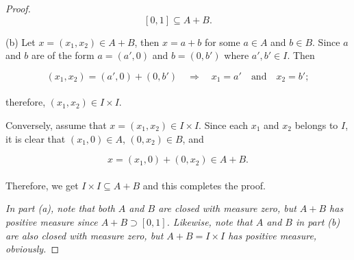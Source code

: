 \documentclass[12pt, a4paper, openany, twoside]{book}
\theoremstyle{definition}
\theoremstyle{remark}
\theoremstyle{plain}
\numberwithin{equation}{section}
\begin{document}
\begin{proof}
    \[[0,1]\subseteq A+B.\]

    \vspace{5mm}
    (b) Let $x=(x_1,x_2)\in A+B$, then $x=a+b$ for some $a\in A$ and $b\in B$. Since $a$ and $b$ are of the form $a=(a',0)$ and $b=(0,b')$ where $a',b'\in I$. Then

    \[(x_1,x_2)=(a',0)+(0,b')\quad\Longrightarrow\quad x_1=a'\quad\text{and}\quad x_2=b';\]
    \\
    therefore, $(x_1,x_2)\in I\times I$. 

    Conversely, assume that $x=(x_1,x_2)\in I\times I$. Since each $x_1$ and $x_2$ belongs to $I$, it is clear that $(x_1,0)\in A$, $(0,x_2)\in B$, and

    \[x=(x_1,0)+(0,x_2)\in A+B.\]
    \\
    Therefore, we get $I\times I\subseteq A+B$ and this completes the proof.

    \vspace{5mm}
    \emph{In part (a), note that both $A$ and $B$ are closed with measure zero, but $A+B$ has positive measure since $A+B\supset [0,1]$. Likewise, note that $A$ and $B$ in part (b) are also closed with measure zero, but $A+B=I\times I$ has positive measure, obviously.}
\end{proof}

\newpage
\end{document}
